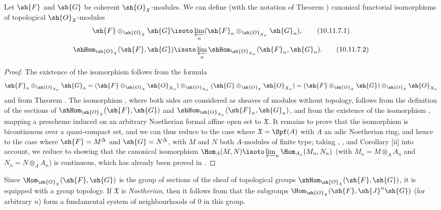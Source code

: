 \begin{proposition}[10.11.7]
\label{I.10.11.7}
Let $\sh{F}$ and $\sh{G}$ be coherent $\sh{O}_\mathfrak{X}$-modules.
We can define (with the notation of Theorem ) canonical functorial isomorphisms of topological $\sh{O}_\mathfrak{X}$-modules 
\[
\label{I.10.11.7.1}
  \sh{F}\otimes_{\sh{O}_\mathfrak{X}}\sh{G}\isoto\varprojlim_n(\sh{F}_n\otimes_{\sh{O}_{X_n}}\sh{G}_n),
  \tag{10.11.7.1}
\]
\[
\label{I.10.11.7.2}
  \shHom_{\sh{O}_\mathfrak{X}}(\sh{F},\sh{G})\isoto\varprojlim_n\shHom_{\sh{O}_{X_n}}(\sh{F}_n,\sh{G}_n).
  \tag{10.11.7.2}
\]
\end{proposition}

\begin{proof}
The existence of the isomorphism  follows from the formula
\[
  \sh{F}_n\otimes_{\sh{O}_{X_n}}\sh{G}_n=(\sh{F}\otimes_{\sh{O}_\mathfrak{X}}\sh{O}_{X_n})\otimes_{\sh{O}_{X_n}}(\sh{G}\otimes_{\sh{O}_\mathfrak{X}}\sh{O}_{X_n})=(\sh{F}\otimes_{\sh{O}_\mathfrak{X}}\sh{G})\otimes_{\sh{O}_\mathfrak{X}}\sh{O}_{X_n}
\]
and from Theorem .
The isomorphism , where both sides are considered as sheaves of modules without topology, follows from the definition of the sections of $\shHom_{\sh{O}_\mathfrak{X}}(\sh{F},\sh{G})$ and $\shHom_{\sh{O}_{X_n}}(\sh{F}_n,\sh{G}_n)$, and from the existence of the isomorphism , mapping a prescheme induced on an arbitrary Noetherian formal affine open set to $\mathfrak{X}$.
It remains to prove that the isomorphism  is bicontinuous over a quasi-compact set, and we can thus reduce to the case where $\mathfrak{X}=\Spf(A)$ with $A$ an adic Noetherian ring, and hence  to the case where $\sh{F}=M^\Delta$ and $\sh{G}=N^\Delta$, with $M$ and $N$ both $A$-modules of finite type; taking , , and Corollary [ii] into account, we reduce to showing that the canonical isomorphism $\Hom_A(M,N)\isoto\varprojlim_n\Hom_{A_n}(M_n,N_n)$ (with $M_n=M\otimes_A A_n$ and $N_n=N\otimes_A A_n$) is continuous, which has already been proved in .
\end{proof}

\begin{env}[10.11.8]
\label{I.10.11.8}
Since $\Hom_{\sh{O}_\mathfrak{X}}(\sh{F},\sh{G})$ is the group of sections of the sheaf of topological groups $\shHom_{\sh{O}_\mathfrak{X}}(\sh{F},\sh{G})$, it is equipped with a group topology.
If $\mathfrak{X}$ is \emph{Noetherian}, then it follows from  that the subgroups $\Hom_{\sh{O}_\mathfrak{X}}(\sh{F},\sh{J}^n\sh{G})$ (for arbitrary $n$) form a fundamental system of neighbourhoods of $0$ in this group.
\end{env}

